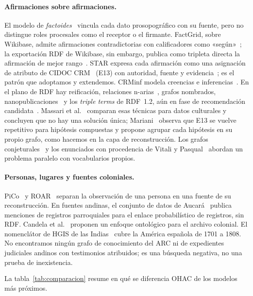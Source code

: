 \documentclass[runningheads]{llncs}
\begin{document}
\paragraph{Afirmaciones sobre afirmaciones.}
El modelo de \emph{factoides}~\cite{pasin2015factoid} vincula cada dato prosopográfico con su fuente, pero no
distingue roles procesales como el receptor o el firmante. FactGrid, sobre Wikibase, admite afirmaciones
contradictorias con calificadores como «según»~\cite{factgrid}; la exportación RDF de Wikibase, sin embargo, publica
como tripleta directa la afirmación de mejor rango~\cite{wikibaserdf}. STAR expresa cada afirmación como una
asignación de atributo de CIDOC CRM~\cite{crm713} (E13) con autoridad, fuente y
evidencia~\cite{andrews2023star,andrews2025star}; es el patrón que adoptamos y extendemos. CRMinf modela creencias e
inferencias~\cite{doerr2011factual,crminf121}. En el plano de RDF hay reificación, relaciones
n-arias~\cite{noy2006nary}, grafos nombrados, nanopublicaciones~\cite{groth2010nanopub,kuhn2016nanopub} y los
\emph{triple terms} de RDF~1.2, aún en fase de recomendación candidata~\cite{rdf12}. Massari et
al.~\cite{massari2025} comparan esas técnicas para datos culturales y concluyen que no hay una solución única;
Mariani~\cite{mariani2023} observa que E13 se vuelve repetitivo para hipótesis compuestas y propone agrupar cada
hipótesis en su propio grafo, como hacemos en la capa de reconstrucción. Los grafos
conjeturales~\cite{daquino2022conjectural} y los enunciados con procedencia de Vitali y
Pasqual~\cite{vitali2026dec} abordan un problema paralelo con vocabularios propios.

\paragraph{Personas, lugares y fuentes coloniales.}
PiCo~\cite{pico} y ROAR~\cite{roar} separan la observación de una persona en una fuente de su reconstrucción. En
fuentes andinas, el conjunto de datos de Aucará~\cite{melo2026aucara} publica menciones de registros parroquiales
para el enlace probabilístico de registros, sin RDF. Candela et al.~\cite{candela2023colonial} proponen un enfoque
ontológico para el archivo colonial. El nomenclátor de HGIS de las Indias~\cite{stangl2018hgis} cubre la América
española de 1701 a 1808. No encontramos ningún grafo de conocimiento del ARC ni de expedientes judiciales andinos con
testimonios atribuidos; es una búsqueda negativa, no una prueba de inexistencia.

La tabla~\ref{tab:comparacion} resume en qué se diferencia OHAC de los modelos más próximos.
\end{document}
